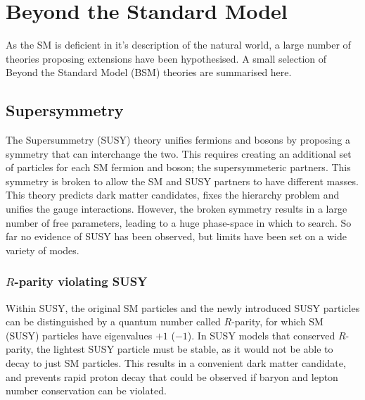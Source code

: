 


\section{Beyond the Standard Model}
\label{sec:intro_BSM}
As the SM is deficient in it's description of the natural world, a large number of theories proposing extensions have been hypothesised.
A small selection of Beyond the Standard Model (BSM) theories are summarised here. 

\subsection{Supersymmetry}

The Supersummetry (SUSY) theory unifies fermions and bosons by proposing a symmetry that can interchange the two. This requires creating an additional set of particles for each SM fermion and boson; the supersymmeteric partners. This symmetry is broken to allow the SM and SUSY partners to have different masses. This theory predicts dark matter candidates, fixes the hierarchy problem and unifies the gauge interactions. 
However, the broken symmetry results in a large number of free parameters, leading to a huge phase-space in which to search. So far no evidence of SUSY has been observed, but limits have been set on a wide variety of modes. 

\subsubsection{$R$-parity violating SUSY}

Within SUSY, the original SM particles and the newly introduced SUSY particles can be distinguished by a quantum number called $R$-parity, for which SM (SUSY) particles have eigenvalues $+1$ ($-1$). In SUSY models that conserved $R$-parity, the lightest SUSY particle must be stable, as it would not be able to decay to just SM particles. This results in a convenient dark matter candidate, and prevents rapid proton decay that could be observed if baryon and lepton number conservation can be violated. 

